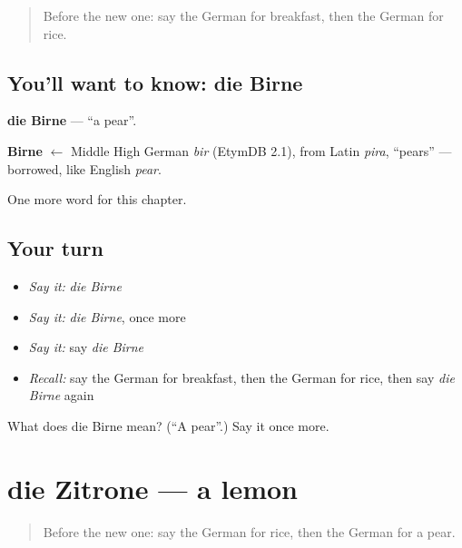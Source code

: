 \label{lesson:GE-C72-birne}



\begin{quote}
Before the new one: say the German for breakfast, then the German for rice.
\end{quote}

\subsection*{You'll want to know: die Birne}
\textbf{die Birne} — \textquotedblleft{}a pear\textquotedblright{}.

\begin{cousinweb}
\textbf{Birne} $\leftarrow$ Middle High German \emph{bir} (EtymDB 2.1), from Latin \emph{pira}, \textquotedblleft{}pears\textquotedblright{} — borrowed, like English \emph{pear}.
\end{cousinweb}

\begin{grammarlens}[title={What you've built}]
One more word for this chapter.
\end{grammarlens}

\subsection*{Your turn}
\begin{itemize}
\raggedright
  \item \emph{Say it:} \emph{die Birne}
  \item \emph{Say it:} \emph{die Birne}, once more
  \item \emph{Say it:} say \emph{die Birne}
  \item \emph{Recall:} say the German for breakfast, then the German for rice, then say \emph{die Birne} again
\end{itemize}

\begin{tcolorbox}[breakable,colback=teal!4,colframe=teal!35!black,title={Before you move on}]
What does die Birne mean? (\textquotedblleft{}A pear\textquotedblright{}.) Say it once more.
\end{tcolorbox}
\section[die Zitrone]{die Zitrone — a lemon}

\label{lesson:GE-C72-zitrone}



\begin{quote}
Before the new one: say the German for rice, then the German for a pear.
\end{quote}

